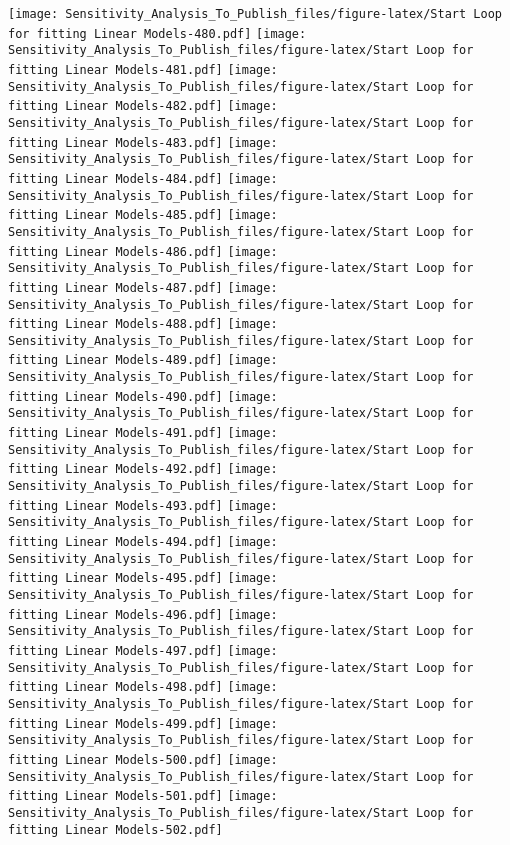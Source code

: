\documentclass[
]{article}
\begin{document}
\texttt{[image: Sensitivity\_Analysis\_To\_Publish\_files/figure-latex/Start Loop for fitting Linear Models-480.pdf]}
\texttt{[image: Sensitivity\_Analysis\_To\_Publish\_files/figure-latex/Start Loop for fitting Linear Models-481.pdf]}
\texttt{[image: Sensitivity\_Analysis\_To\_Publish\_files/figure-latex/Start Loop for fitting Linear Models-482.pdf]}
\texttt{[image: Sensitivity\_Analysis\_To\_Publish\_files/figure-latex/Start Loop for fitting Linear Models-483.pdf]}
\texttt{[image: Sensitivity\_Analysis\_To\_Publish\_files/figure-latex/Start Loop for fitting Linear Models-484.pdf]}
\texttt{[image: Sensitivity\_Analysis\_To\_Publish\_files/figure-latex/Start Loop for fitting Linear Models-485.pdf]}
\texttt{[image: Sensitivity\_Analysis\_To\_Publish\_files/figure-latex/Start Loop for fitting Linear Models-486.pdf]}
\texttt{[image: Sensitivity\_Analysis\_To\_Publish\_files/figure-latex/Start Loop for fitting Linear Models-487.pdf]}
\texttt{[image: Sensitivity\_Analysis\_To\_Publish\_files/figure-latex/Start Loop for fitting Linear Models-488.pdf]}
\texttt{[image: Sensitivity\_Analysis\_To\_Publish\_files/figure-latex/Start Loop for fitting Linear Models-489.pdf]}
\texttt{[image: Sensitivity\_Analysis\_To\_Publish\_files/figure-latex/Start Loop for fitting Linear Models-490.pdf]}
\texttt{[image: Sensitivity\_Analysis\_To\_Publish\_files/figure-latex/Start Loop for fitting Linear Models-491.pdf]}
\texttt{[image: Sensitivity\_Analysis\_To\_Publish\_files/figure-latex/Start Loop for fitting Linear Models-492.pdf]}
\texttt{[image: Sensitivity\_Analysis\_To\_Publish\_files/figure-latex/Start Loop for fitting Linear Models-493.pdf]}
\texttt{[image: Sensitivity\_Analysis\_To\_Publish\_files/figure-latex/Start Loop for fitting Linear Models-494.pdf]}
\texttt{[image: Sensitivity\_Analysis\_To\_Publish\_files/figure-latex/Start Loop for fitting Linear Models-495.pdf]}
\texttt{[image: Sensitivity\_Analysis\_To\_Publish\_files/figure-latex/Start Loop for fitting Linear Models-496.pdf]}
\texttt{[image: Sensitivity\_Analysis\_To\_Publish\_files/figure-latex/Start Loop for fitting Linear Models-497.pdf]}
\texttt{[image: Sensitivity\_Analysis\_To\_Publish\_files/figure-latex/Start Loop for fitting Linear Models-498.pdf]}
\texttt{[image: Sensitivity\_Analysis\_To\_Publish\_files/figure-latex/Start Loop for fitting Linear Models-499.pdf]}
\texttt{[image: Sensitivity\_Analysis\_To\_Publish\_files/figure-latex/Start Loop for fitting Linear Models-500.pdf]}
\texttt{[image: Sensitivity\_Analysis\_To\_Publish\_files/figure-latex/Start Loop for fitting Linear Models-501.pdf]}
\texttt{[image: Sensitivity\_Analysis\_To\_Publish\_files/figure-latex/Start Loop for fitting Linear Models-502.pdf]}
\end{document}
